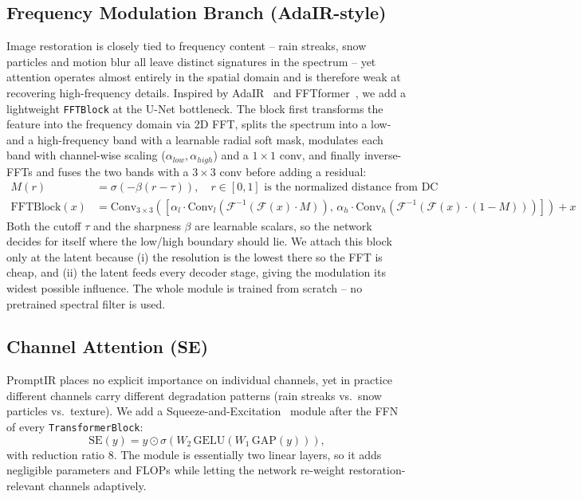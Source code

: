 \documentclass[12pt, a4paper]{article}
\begin{document}
\subsection{Frequency Modulation Branch (AdaIR-style)}
Image restoration is closely tied to frequency content -- rain streaks, snow particles and motion blur all leave distinct signatures in the spectrum -- yet attention operates almost entirely in the spatial domain and is therefore weak at recovering high-frequency details. Inspired by AdaIR~\cite{cui2024adair} and FFTformer~\cite{kong2023fftformer}, we add a lightweight \texttt{FFTBlock} at the U-Net bottleneck. The block first transforms the feature into the frequency domain via 2D FFT, splits the spectrum into a low- and a high-frequency band with a learnable radial soft mask, modulates each band with channel-wise scaling ($\alpha_{low}, \alpha_{high}$) and a $1{\times}1$ conv, and finally inverse-FFTs and fuses the two bands with a $3{\times}3$ conv before adding a residual:
\begin{align}
M(r) &= \sigma\!\left(-\beta (r - \tau)\right), \quad r \in [0, 1] \text{ is the normalized distance from DC} \\
\mathrm{FFTBlock}(x) &= \mathrm{Conv}_{3\times3}\!\left([\alpha_l \cdot \mathrm{Conv}_l(\mathcal{F}^{-1}(\mathcal{F}(x) \cdot M)),\, \alpha_h \cdot \mathrm{Conv}_h(\mathcal{F}^{-1}(\mathcal{F}(x) \cdot (1-M)))]\right) + x
\end{align}
Both the cutoff $\tau$ and the sharpness $\beta$ are learnable scalars, so the network decides for itself where the low/high boundary should lie. We attach this block only at the latent because (i) the resolution is the lowest there so the FFT is cheap, and (ii) the latent feeds every decoder stage, giving the modulation its widest possible influence. The whole module is trained from scratch -- no pretrained spectral filter is used.

\subsection{Channel Attention (SE)}
PromptIR places no explicit importance on individual channels, yet in practice different channels carry different degradation patterns (rain streaks vs.\ snow particles vs.\ texture). We add a Squeeze-and-Excitation~\cite{hu2018se} module after the FFN of every \texttt{TransformerBlock}:
\begin{equation}
\mathrm{SE}(y) = y \odot \sigma\!\left(W_2\,\mathrm{GELU}(W_1\,\mathrm{GAP}(y))\right),
\end{equation}
with reduction ratio 8. The module is essentially two linear layers, so it adds negligible parameters and FLOPs while letting the network re-weight restoration-relevant channels adaptively.
\end{document}
